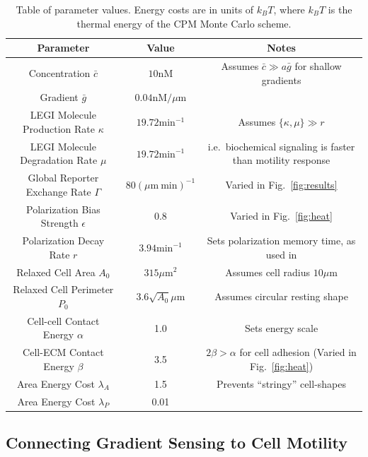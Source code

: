 \begin{table}[b]
\centering
\footnotesize
\begin{tabular}{ |c|c|c| }
\hline
Parameter & Value & Notes \\ \hline
Concentration $\bar{c}$ & $10 \text{nM}$ & Assumes $\bar{c} \gg a\bar{g}$ for shallow gradients \cite{malet2015collective,ellison2016cell} \\
Gradient $\bar{g}$ & $0.04 \text{nM/}\mu\text{m}$ & \\ \hline
LEGI Molecule Production Rate $\kappa$ & $19.72 \text{min}^{-1}$ & Assumes $ \{\kappa,\mu\} \gg r$ \\
LEGI Molecule Degradation Rate $\mu$ & $19.72 \text{min}^{-1}$ & i.e.\ biochemical signaling is faster than motility response \\ \hline
Global Reporter Exchange Rate $\Gamma$ & $80 (\mu\text{m} \ \text{min})^{-1}$ & Varied in Fig.\ \ref{fig:results} \\ \hline
Polarization Bias Strength $\epsilon$ & 0.8 & Varied in Fig.\ \ref{fig:heat} \\ \hline
Polarization Decay Rate $r$ & $3.94 \text{min}^{-1}$ & Sets polarization memory time, as used in \cite{szabo2010collective} \\ \hline
Relaxed Cell Area $A_0$ & $315 \mu\text{m}^2$ & Assumes cell radius $10 \mu\text{m}$ \cite{leber2009molecular} \\ \hline
Relaxed Cell Perimeter $P_0$ & $3.6\sqrt{A_0} \mu\text{m}$ & Assumes circular resting shape \\ \hline
Cell-cell Contact Energy $\alpha$ & 1.0 & Sets energy scale \\
Cell-ECM Contact Energy $\beta$ & 3.5 & $2\beta > \alpha$ for cell adhesion \cite{graner1992simulation} (Varied in Fig.\ \ref{fig:heat}) \\ \hline
Area Energy Cost $\lambda_A$ & 1.5  & Prevents ``stringy'' cell-shapes \\
Area Energy Cost $\lambda_P$ & 0.01 & \\ \hline
\end{tabular}
\caption{Table of parameter values. Energy costs are in units of $k_B T$, where $k_B T$ is the thermal energy of the CPM Monte Carlo scheme.}
\label{table:param}
\end{table}


\subsection{Connecting Gradient Sensing to Cell Motility}

